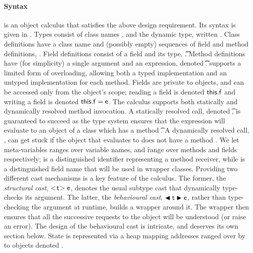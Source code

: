 \documentclass[acmlarge, anonymous, authordraft, review]{acmart} %
\begin{document}
\paragraph{Syntax}  
\kafka is an object calculus that satisfies the above design
requirement. Its syntax is given in .  Types consist of class
names \C, \D and the dynamic type, written \any.  Class definitions have a
class name and (possibly empty) sequences of field and method definitions,
\Class{}. Field definitions consist of a field and its
type, \Fdef\f\t. Method definitions have (for simplicity) a single argument
and an expression, denoted \Mdef\m\x\t\t\e.  \kafka supports a limited form
of overloading, allowing both a typed implementation and an untyped
implementation for each method.  Fields are private to objects, and can be
accessed only from the object's scope; reading a field is denoted
\(\FRead\f\) and writing a field is denoted \(\FWrite\f\e \).  The calculus
supports both statically and dynamically resolved method invocation.  A
statically resolved call, denoted \KCall\e\m\ep\t\tp, is guaranteed to
succeed as the type system ensures that the expression \e will evaluate to
an object of a class which has a method \Mtype\m\t\tp. A dynamically
resolved call, \DynCall\e\m\ep, can get stuck if the object that \e
evaluates to does not have a method \Mtype\m\any\any.  We let meta-variables
\x ranges over variable names, \m and \f range over methods and fields
respectively; \this is a distinguished identifier representing a method
receiver, while \that is a distinguished field name that will be used in
wrapper classes.  Providing two different cast mechanisms is a key feature
of the calculus.  The former, the \emph{structural cast}, \(\SubCast\t\e\),
denotes the usual subtype cast that dynamically type-checks its argument.
The latter, the \emph{behavioural cast}, \(\BehCast\t\e\), rather than
type-checking the argument at runtime, builds a wrapper around it.  The
wrapper then ensures that all the successive requests to the object will be
understood (or raise an error). The design of the behavioural cast is
intricate, and deserves its own section below.  State is represented via a
heap \s mapping addresses ranged over by \a to objects
denoted \hspace{-1mm}\obj{}.
\end{document}
